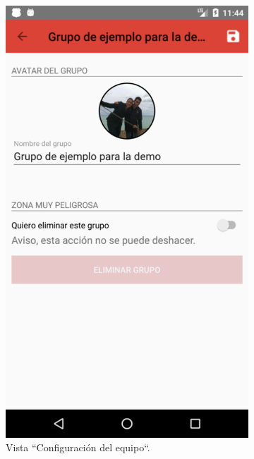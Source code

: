 \documentclass[twoside]{report}
\begin{document}
\begin{figure}[H]
\begin{center}
\begin{subfigure}[t]{.3\linewidth}
		\includegraphics[scale=0.2]{images/userguide/17.png}
		\caption{Vista “Configuración del equipo“.}
	\end{subfigure}\hspace{2mm}%
	\begin{subfigure}[t]{.3\linewidth}

\end{subfigure}
\end{center}
\end{figure}
\end{document}
